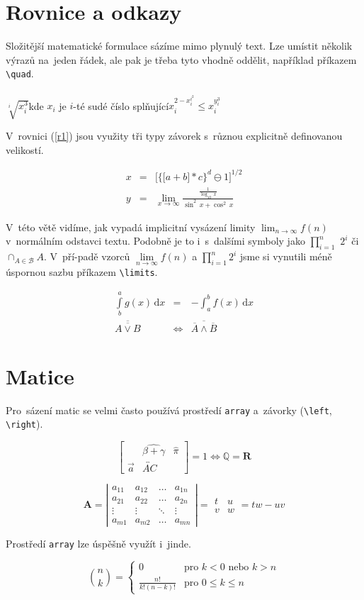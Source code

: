 \documentclass[11pt, a4paper, twocolumn ]{article}
\theoremstyle{definition}
\begin{document}
\section{Rovnice a odkazy}
Složitější matematické formulace sázíme mimo plynulý
text. Lze umístit několik výrazů na~jeden řádek, ale pak je
třeba tyto vhodně oddělit, například příkazem \verb|\quad|.\\ \\
$\sqrt[i]{x^3_i}$\quad kde $x_i$ je $i$-té sudé číslo splňující\quad $x_i^{2-{x_i^{i^2}}} \leq x_i^{y_i^3}$ \smallskip \par
V~rovnici (\ref{r1}) jsou využity tři typy závorek s~různou explicitně definovanou velikostí.

\begin{eqnarray}
    x & = & \bigg[\Big\{\big[a+b\big] * c \Big\}^d \ominus 1 \bigg]^{1/2}  \label{r1} \\
    y & = & \lim_{x\to\infty}\frac{\frac{1}{\log_{10}\,{x}}}{\sin^2\,{x} + \cos^2\,{x}}\nonumber
\end{eqnarray}\par

V~této větě vidíme, jak vypadá implicitní vysázení limity $\lim_{n \to \infty} f(n)$ v~normálním odstavci textu. Podobně je to i~s~dalšími symboly jako $\prod_{i=1}^n$ $2^i$ či $\cap_{A \in \mathcal{B}} A$. V~pří-padě vzorců $\lim\limits_{n \to \infty} f(n)$ a $\prod\limits_{i=1}^n 2^i$ jsme si vynutili méně úspornou sazbu příkazem \verb|\limits|.

\begin{eqnarray}
		\int\limits^a_b g(x) \, \mathrm{d}x & = & - \int^b_a f(x) \, \mathrm{d}x \\
		\overline{\overline{A \vee B}} & \Leftrightarrow & \overline{\overline{A} \wedge \overline{B}}
\end{eqnarray}

\section{Matice}
Pro~sázení matic se velmi často používá prostředí \texttt{array} a~závorky (\verb|\left|, \verb|\right|).

$$
\left[
\begin{array}{ccc}
 & \widehat{\beta + \gamma} & \hat{\pi} \\
\vec{a} & \overleftrightarrow{AC} &
\end{array}
\right]
= 1 \Longleftrightarrow \mathbb{Q} = \mathbf{R}
$$

$$
		\mathbf{A} =
		\left|
		\begin{array}{cccc}
			a_{11} & a_{12} & \ldots & a_{1n} \\
			a_{21} & a_{22} & \ldots & a_{2n} \\
			\vdots & \vdots & \ddots & \vdots \\
			a_{m1} & a_{m2} & \ldots & a_{mn}
		\end{array}
		\right|
		=
		\left.
		\begin{array}{cc}
			t & u \\
			v & w
		\end{array}
		\right.
		= tw - uv
$$

Prostředí \texttt{array} lze úspěšně využít i~jinde.

$$
		\binom{n}{k} =
		\left\{
		\begin{array}{ll}
		    0 & \text{pro } k < 0 \text{ nebo } k > n \\
			\frac{n!}{k! (n - k)!} & \text{pro } 0 \leq k \leq n 
		\end{array}
		\right.
$$
\end{document}
